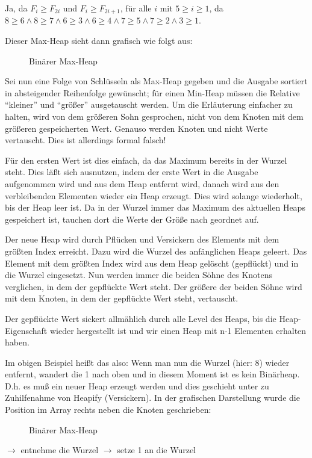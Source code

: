 \documentclass[ngerman,draft,parskip=half*,twoside]{scrreprt}
\theoremstyle{break}
\begin{document}
Ja, da $F_{i}\geq F_{2i}$ und $F_{i}\geq F_{2i+1}$, für alle $i$ mit $5\geq i \geq 1$, da $8\geq 6 \wedge 8\geq 7 \wedge6\geq 3 \wedge 
6\geq 4 \wedge 7\geq 5 \wedge 7\geq 2 \wedge 3\geq 1$.

Dieser Max-Heap sieht dann grafisch wie folgt aus:

\begin{figure}[H]
	\centering
	\caption{Binärer Max-Heap}
	\label{101103c}
\end{figure}
\vspace{3mm}

Sei nun eine Folge von Schlüsseln als Max-Heap gegeben und die Ausgabe sortiert in absteigender Reihenfolge gewünscht; für einen
Min-Heap müssen die Relative "`kleiner"' und "`größer"' ausgetauscht werden. Um die Erläuterung einfacher zu halten, wird von dem
größeren Sohn gesprochen, nicht von dem Knoten mit dem größeren gespeicherten Wert. Genauso werden Knoten und nicht Werte vertauscht.
Dies ist allerdings formal falsch!

Für den ersten Wert ist dies einfach, da das Maximum bereits in der Wurzel steht.
Dies läßt sich ausnutzen, indem der erste Wert in die Ausgabe aufgenommen wird und aus dem Heap entfernt wird, danach wird aus den
verbleibenden Elementen wieder ein Heap erzeugt. Dies wird solange wiederholt, bis der Heap leer ist. Da in der Wurzel immer das Maximum
des aktuellen Heaps gespeichert ist, tauchen dort die Werte der Größe nach geordnet auf.

Der neue Heap wird durch Pflücken und Versickern des Elements mit dem größten Index erreicht. Dazu wird die Wurzel des anfänglichen Heaps geleert. Das Element mit dem größten Index wird aus dem Heap gelöscht
(gepflückt) und in die Wurzel eingesetzt.
Nun werden immer die beiden Söhne des Knotens verglichen, in dem der gepflückte Wert steht. Der größere der beiden Söhne wird mit
dem Knoten, in dem der gepflückte Wert steht, vertauscht.

Der gepflückte Wert sickert allmählich durch alle Level des Heaps, bis die
Heap-Eigenschaft wieder hergestellt ist und wir einen Heap mit n-1 Elementen erhalten haben.

Im obigen Beispiel heißt das also:
Wenn man nun die Wurzel (hier: 8) wieder entfernt, wandert die 1 nach oben und in diesem Moment ist es kein Binärheap. D.h. es muß
ein neuer Heap erzeugt werden und dies geschieht unter zu Zuhilfenahme von Heapify (Versickern).
In der grafischen Darstellung wurde die Position im Array rechts neben die Knoten geschrieben:
\begin{figure}[H]
	\centering \hspace{2cm}
	\caption{Binärer Max-Heap}
	\label{101103de}
\end{figure}
\vspace{3mm}
\noindent
$\rightarrow$ entnehme die Wurzel \hspace{5cm}
$\rightarrow$ setze 1 an die Wurzel
\end{document}
